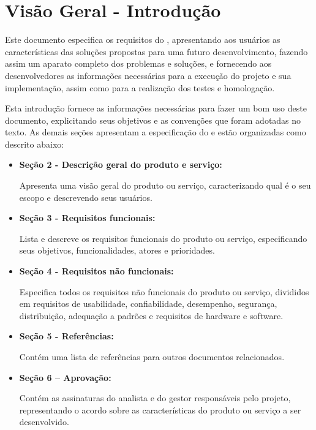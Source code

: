 \section{Visão Geral - Introdução}
\hspace{2.0cm}

Este documento especifica os requisitos do \textbf{\mysiglaproject},
apresentando aos usuários as características das soluções
propostas para uma futuro desenvolvimento, fazendo assim
um aparato completo dos problemas e soluções, e fornecendo
aos desenvolvedores as informações necessárias para a execução
do projeto e sua implementação, assim como para a realização
dos testes e homologação.


Esta introdução fornece as informações necessárias para fazer
um bom uso deste documento, explicitando seus objetivos e as
convenções que foram adotadas no texto. As demais seções
apresentam a especificação do \textbf{\mysiglaproject} e estão 
organizadas como descrito abaixo:

\begin{itemize}
  \item \textbf{Seção 2 - Descrição geral do produto e serviço:}

    Apresenta uma visão geral do produto ou serviço, 
    caracterizando qual é o seu escopo e descrevendo seus usuários.

  \item \textbf{Seção 3 - Requisitos funcionais:}

    Lista e descreve os requisitos funcionais do produto ou serviço, 
    especificando seus objetivos, funcionalidades, atores e prioridades.

  \item \textbf{Seção 4 - Requisitos não funcionais:}

    Especifica todos os requisitos não funcionais do produto ou serviço, 
    divididos em requisitos de usabilidade, confiabilidade, desempenho, 
    segurança, distribuição, adequação a padrões e requisitos de hardware 
    e software.

  \item \textbf{Seção 5 - Referências:}

    Contém uma lista de referências para outros documentos relacionados.

  \item \textbf{Seção 6 – Aprovação:}

    Contém as assinaturas do analista e do gestor responsáveis pelo projeto, 
    representando o acordo sobre as características do produto ou serviço 
    a ser desenvolvido.

\end{itemize}

